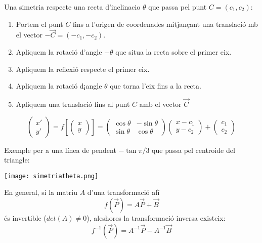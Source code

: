 \documentclass{beamer}
\begin{document}
\begin{frame}
  Una simetria respecte una recta d'inclinacio $\theta$ que passa pel punt $C=(c_1,c_2)$:
  \begin{enumerate}
    \item Portem el punt $C$ fins a l'origen de coordenades mitjançant una translació mb el vector $-\overrightarrow{C}=(-c_1,-c_2)$.
    \item Apliquem la rotació d'angle $-\theta$ que situa la recta sobre el primer eix.
    \item Apliquem la reflexió respecte el primer eix.
    \item Apliquem la rotació d¡angle $\theta$ que torna l'eix fins a la recta.
    \item Apliquem una translació fins al punt $C$ amb el vector $\overrightarrow{C}$
  \end{enumerate}

  \[
    \begin{pmatrix} x'\\y' \end{pmatrix}=
      f \left[ \begin{pmatrix} x\\y \end{pmatrix} \right]=
      \begin{pmatrix}\cos{\theta}&-\sin{\theta}\\\sin{\theta}&\cos{\theta}\end{pmatrix}
      \begin{pmatrix}x-c_1\\y-c_2\end{pmatrix} +
      \begin{pmatrix}c_1\\c_2\end{pmatrix}
  \]
\end{frame}
\begin{frame}
  Exemple per a una línea de pendent $-\tan{\pi/3}$ que passa pel centroide del triangle:
  \begin{center}
    \texttt{[image: simetriatheta.png]}
  \end{center}
\end{frame}


\begin{frame}
  En general, si la matriu $A$ d'una transformació afí
  \[
    f(\overrightarrow{P}) = A \overrightarrow{P} + \overrightarrow{B}
  \]
  és invertible ($det(A) \neq 0$), aleshores la transformació inversa existeix:
  \[
    f^{-1}(\overrightarrow{P})= A^{-1} \overrightarrow{P} - A^{-1} \overrightarrow{B}
  \]
\end{frame}
\end{document}

